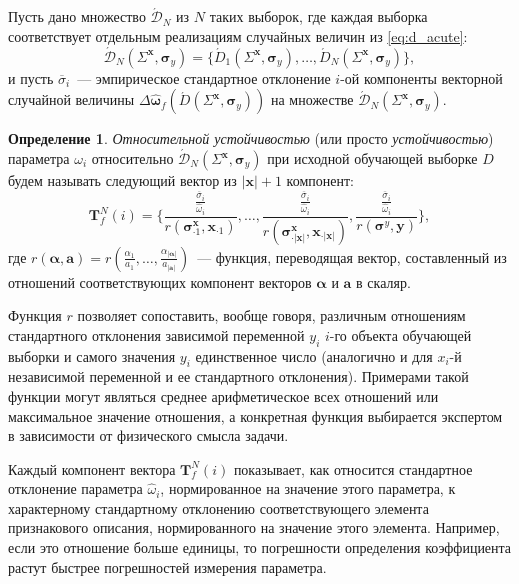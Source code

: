 \documentclass[12pt,a4paper]{article}
\theoremstyle{definition}
\newtheorem{defin}{Определение}
\begin{document}
Пусть дано множество $\acute{\mathcal{D}}_N$ из $N$ таких выборок, где каждая выборка
соответствует отдельным реализациям случайных величин из \eqref{eq:d_acute}:
\[
  \acute{\mathcal{D}}_N (\Sigma^{\mathbf{x}}, \boldsymbol{\sigma}_y) = \{ \acute{D}_1 (\Sigma^{\mathbf{x}}, \boldsymbol{\sigma}_y), \dots, \acute{D}_N (\Sigma^{\mathbf{x}}, \boldsymbol{\sigma}_y) \},
\]
и пусть $\overline{\sigma}_i$~--- эмпирическое стандартное отклонение $i$-ой компоненты
векторной случайной величины
$\Delta\hat{\boldsymbol{\omega}}_f(\acute{D} (\Sigma^{\mathbf{x}}, \boldsymbol{\sigma}_y) )$
на множестве $\acute{\mathcal{D}}_N (\Sigma^{\mathbf{x}}, \boldsymbol{\sigma}_y)$.
\begin{defin}
\emph{Относительной устойчивостью} (или просто \emph{устойчивостью}) параметра
$\omega_i$ относительно $\acute{\mathcal{D}}_N (\Sigma^{\mathbf{x}}, \boldsymbol{\sigma}_y)$
при исходной обучающей выборке $D$ будем называть следующий вектор
из $| \mathbf{x} | + 1$ компонент:
\begin{equation}
  \mathbf{T}^N_f(i) = \Big\{ \frac{\frac{\overline{\sigma}_i}{\hat{\omega}_i}}{r(\boldsymbol{\sigma}^\mathbf{x}_{\cdot 1}, \mathbf{x}_{\cdot 1})}, \dots, \frac{\frac{\overline{\sigma}_i}{\hat{\omega}_i}}{r(\boldsymbol{\sigma}^\mathbf{x}_{\cdot |\mathbf{x}|}, \mathbf{x}_{\cdot |\mathbf{x}|})}, \frac{\frac{\overline{\sigma}_i}{\hat{\omega}_i}}{r(\boldsymbol{\sigma}^y, \mathbf{y})} \Big\},
  \label{eq:t_rel}
\end{equation}
где $r(\boldsymbol{\alpha}, \mathbf{a}) = r(\frac{\alpha_1}{a_1}, \dots, \frac{\alpha_{|\boldsymbol{\alpha}|}}{a_{|\mathbf{a}|}})$~---
функция, переводящая вектор, составленный из отношений соответствующих компонент векторов $\boldsymbol{\alpha}$ и $\mathbf{a}$ в скаляр.
\end{defin}

Функция $r$ позволяет сопоставить, вообще говоря, различным отношениям стандартного
отклонения зависимой переменной $y_i$ $i$-го объекта обучающей выборки и самого значения $y_i$
единственное число (аналогично и для $x_i$-й независимой переменной и ее стандартного отклонения).
Примерами такой функции могут являться среднее арифметическое
всех отношений или максимальное значение отношения, а конкретная функция выбирается
экспертом в зависимости от физического смысла задачи.

Каждый компонент вектора $\mathbf{T}^N_f(i)$ показывает, как относится стандартное отклонение
параметра $\hat{\omega}_i$, нормированное на значение этого параметра, к характерному стандартному
отклонению соответствующего элемента признакового описания, нормированного на значение этого
элемента. Например, если это отношение больше единицы, то погрешности определения коэффициента
растут быстрее погрешностей измерения параметра.
\end{document}
